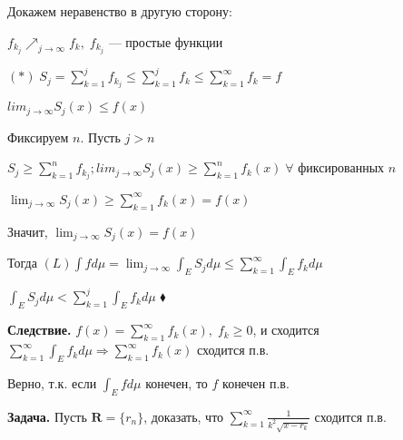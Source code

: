 Докажем неравенство в другую сторону:

$f_{k_j} \nearrow_{j \rightarrow \infty} f_k, \; f_{k_j}$ ---
простые функции

$(*) \; S_j = \sum_{k = 1}^j f_{k_j} \leqslant \sum_{k=1}^j f_k
\leqslant \sum_{k=1}^{\infty} f_k = f$

$lim_{j \rightarrow \infty} S_j(x) \leqslant f(x)$

Фиксируем $n$. Пусть $j > n$

$S_j \geqslant \sum_{k=1}^n f_{k_j}; lim_{j \rightarrow \infty}
S_j (x) \geqslant \sum_{k=1}^n f_k(x) \; \forall$ фиксированных
$n$

$\lim_{j \rightarrow \infty} S_j (x) \geqslant \sum_{k=1}^{\infty}
f_k(x) = f(x)$

Значит, $\lim_{j \rightarrow \infty} S_j (x) = f(x)$

Тогда $(L) \int f d\mu = \lim_{j \rightarrow \infty} \int_E S_j d
\mu \leqslant \sum_{k=1}^{\infty} \int_E f_k d \mu$

$\int_E S_j d \mu < \sum_{k=1}^j \int_E f_k d \mu $
$\blacklozenge$

\textbf{Следствие.} \quad  $f(x) = \sum_{k=1}^{\infty} f_k(x), \;
f_k \geqslant 0$, и сходится $\sum_{k=1}^{\infty} \int_E f_k d \mu
\Rightarrow \sum_{k=1}^{\infty} f_k(x)$ сходится п.в.

Верно, т.к. если $\int_E f d \mu$ конечен, то  $f$ конечен п.в.

\textbf{Задача.} \quad Пусть $\mathbf{R} = \{r_n\}$, доказать, что
$\sum_{k=1}^{\infty} \frac{1}{k^2\sqrt{x - r_k}}$ сходится п.в.

